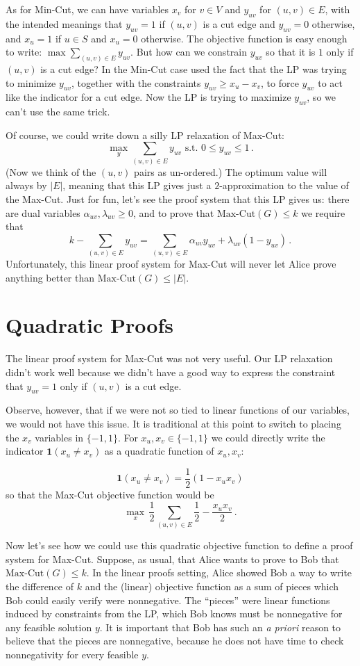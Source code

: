 \documentclass[11pt]{article}
\newcommand{\Ind}[1]{\mathbf{1}\left ( #1\right )}
\begin{document}
As for Min-Cut, we can have variables $x_v$ for $v \in V$ and $y_{uv}$ for $(u,v) \in E$, with the intended meanings that $y_{uv} = 1$ if $(u,v)$ is a cut edge and $y_{uv} = 0$ otherwise, and $x_u = 1$ if $u \in S$ and $x_u = 0$ otherwise.
The objective function is easy enough to write: $\max \sum_{(u,v) \in E} y_{uv}$.
But how can we constrain $y_{uv}$ so that it is $1$ only if $(u,v)$ is a cut edge?
In the Min-Cut case used the fact that the LP was trying to minimize $y_{uv}$, together with the constraints $y_{uv} \geq x_u - x_v$, to force $y_{uv}$ to act like the indicator for a cut edge.
Now the LP is trying to maximize $y_{uv}$, so we can't use the same trick.

Of course, we could write down a silly LP relaxation of Max-Cut:
\[
  \max_{y} \sum_{(u,v) \in E} y_{uv} \text{ s.t. } 0 \leq y_{uv} \leq 1 \, .
\]
(Now we think of the $(u,v)$ pairs as un-ordered.)
The optimum value will always by $|E|$, meaning that this LP gives just a $2$-approximation to the value of the Max-Cut.
Just for fun, let's see the proof system that this LP gives us: there are dual variables $\alpha_{uv}, \lambda_{uv} \geq 0$, and to prove that $\text{Max-Cut}(G) \leq k$ we require that
\[
k - \sum_{(u,v) \in E} y_{uv} = \sum_{(u,v) \in E} \alpha_{uv} y_{uv} + \lambda_{uv}(1- y_{uv}) \, .
\]
Unfortunately, this linear proof system for Max-Cut will never let Alice prove anything better than $\text{Max-Cut}(G) \leq |E|$.

\section{Quadratic Proofs}
The linear proof system for Max-Cut was not very useful.
Our LP relaxation didn't work well because we didn't have a good way to express the constraint that $y_{uv} = 1$ only if $(u,v)$ is a cut edge.

Observe, however, that if we were not so tied to linear functions of our variables, we would not have this issue.
It is traditional at this point to switch to placing the $x_v$ variables in $\{-1,1\}$.
For $x_u,x_v \in \{-1,1\}$ we could directly write the indicator $\Ind{x_u \neq x_v}$ as a quadratic function of $x_u, x_v$:

\[
\Ind{x_u \neq x_v} = \frac 12 (1 - x_u x_v)
\]
so that the Max-Cut objective function would be
\[
  \max_x \, \frac 12 \sum_{(u,v) \in E} \frac 12 - \frac{x_u x_v}{2} \, .
\]

Now let's see how we could use this quadratic objective function to define a proof system for Max-Cut.
Suppose, as usual, that Alice wants to prove to Bob that $\text{Max-Cut}(G) \leq k$.
In the linear proofs setting, Alice showed Bob a way to write the difference of $k$ and the (linear) objective function as a sum of pieces which Bob could easily verify were nonnegative.
The ``pieces'' were linear functions induced by constraints from the LP, which Bob knows must be nonnegative for any feasible solution $y$.
It is important that Bob has such an \emph{a priori} reason to believe that the pieces are nonnegative, because he does not have time to check nonnegativity for every feasible $y$.
\end{document}
